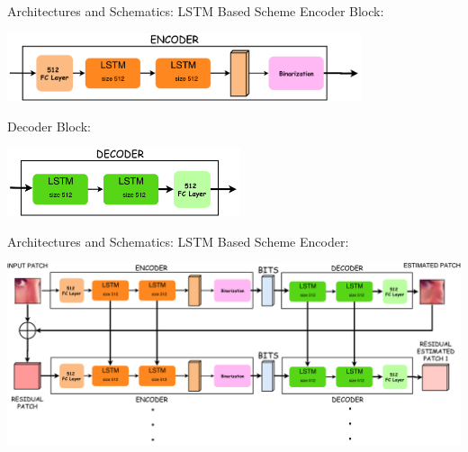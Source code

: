 \documentclass[10pt]{beamer}
\begin{document}
\begin{frame}{Architectures and Schematics: LSTM Based Scheme}
  Encoder Block:
  \begin{center}
    \includegraphics[height=20mm]{./img/LSTM_encoder_block.pdf}
  \end{center}
  Decoder Block:
  \begin{center}
    \includegraphics[height=20mm]{./img/LSTM_decoder_block.pdf}
  \end{center}
\end{frame}
\begin{frame}{Architectures and Schematics: LSTM Based Scheme}
  Encoder:\\
  \vspace{1mm}
  \begin{center}
    \includegraphics[width=\linewidth]{./img/LSTM_Scheme.pdf}
  \end{center}
  \vspace{15mm}
  \begin{figure}
    \begin{minipage}{\textwidth}
             \\
    \end{minipage}
\end{figure}
\end{frame}
\end{document}
